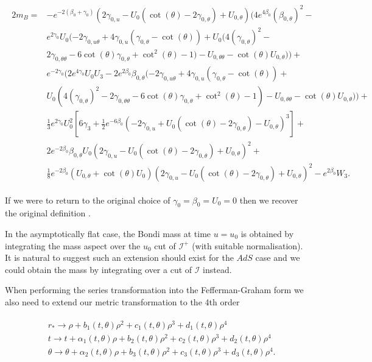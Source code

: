 \documentclass[a4paper,11pt]{article}
\numberwithin{equation}{section}
\begin{document}
\begin{align} \label{eq: mass_aspect_1}
\begin{split}
2m_B=&-e^{-2 (\beta_{0}+\gamma_{0})} (2 \gamma_{0,u}-U_{0} (\cot (\theta )-2 \gamma_{0,\theta})+U_{0,\theta}) (4 e^{4 \beta_{0}} (\beta_{0,\theta})^2- \\
&e^{2 \gamma_{0}} U_{0} (-2 \gamma_{0,u \theta}+4 \gamma_{0,u} (\gamma_{0,\theta}-\cot (\theta ))+U_{0} (4 (\gamma_{0,\theta})^2-\\
&2 \gamma_{0,\theta \theta}-6 \cot (\theta ) \gamma_{0,\theta}+\cot ^2(\theta )-1)-U_{0,\theta \theta}-\cot (\theta ) U_{0,\theta}))+\\
&e^{-2 \gamma_{0}} (2 e^{4 \gamma_{0}} U_{0} U_{3}-2 e^{2 \beta_{0}} \beta_{0,\theta} (-2 \gamma_{0,u \theta}+4 \gamma_{0,u} (\gamma_{0,\theta}-\cot (\theta ))+\\
&U_{0} (4 (\gamma_{0,\theta})^2-2 \gamma_{0,\theta \theta}-6 \cot (\theta ) \gamma_{0,\theta}+\cot ^2(\theta )-1)-U_{0,\theta \theta}-\cot (\theta ) U_{0,\theta}))+\\
&\frac{1}{3} e^{2 \gamma_{0}} U_{0}^2 \left[6 \gamma_{3}+\frac{1}{2} e^{-6 \beta_{0}} (-2 \gamma_{0,u}+U_{0} (\cot (\theta )-2 \gamma_{0,\theta})-U_{0,\theta})^3\right]+\\
&2 e^{-2 \beta_{0}} \beta_{0,\theta} U_{0} (2 \gamma_{0,u}-U_{0} (\cot (\theta )-2 \gamma_{0,\theta})+U_{0,\theta})^2+\\
&\frac{1}{8} e^{-2 \beta_{0}} (U_{0,\theta}+\cot (\theta ) U_{0}) (2 \gamma_{0,u}-U_{0} (\cot (\theta )-2 \gamma_{0,\theta})+U_{0,\theta})^2-e^{2 \beta_{0}} W_{3}.
\end{split}
\end{align}

\noindent If we were to return to the original choice of $\gamma_0=\beta_0=U_0=0$ then we recover the original definition \cite{Bondi:1962px}.

In the asymptotically flat case, the Bondi mass at time $u=u_0$ is obtained by integrating the mass aspect over the $u_0$ cut of $\mathscr{I^+}$ (with suitable normalisation). It is natural to suggest such an extension should exist for the $AdS$ case and we could obtain the mass by integrating over a cut of $\mathscr{I}$ instead. \par

When performing the series transformation into the Fefferman-Graham form we also need to extend our metric transformation to the 4th order

\begin{align}
\begin{split}
&r_* \rightarrow \rho  + b_1(t,\theta) \rho^2+c_1(t,\theta) \rho^3+d_1(t,\theta) \rho^4 \\
&t \rightarrow t + \alpha_1(t,\theta)\rho + b_2(t,\theta) \rho^2+c_2(t,\theta) \rho^3+d_2(t,\theta) \rho^4  \\
&\theta \rightarrow \theta + \alpha_2(t,\theta)\rho + b_3(t,\theta) \rho^2+c_3(t,\theta) \rho^3+d_3(t,\theta) \rho^4.
\end{split}
\end{align}
\end{document}
